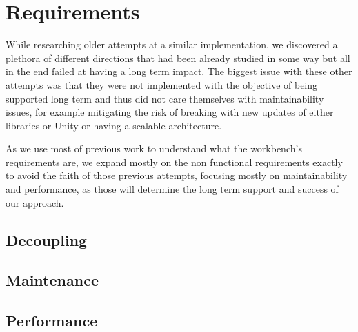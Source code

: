 \section{Requirements}\label{sec:requirements}

While researching older attempts at a similar implementation, we discovered a plethora of different directions that had been already studied in some way but all in the end failed at having a long term impact. The biggest issue with these other attempts was that they were not implemented with the objective of being supported long term and thus did not care themselves with maintainability issues, for example mitigating the risk of breaking with new updates of either libraries or Unity or having a scalable architecture.

As we use most of previous work to understand what the workbench's requirements are, we expand mostly on the non functional requirements exactly to avoid the faith of those previous attempts, focusing mostly on maintainability and performance, as those will determine the long term support and success of our approach. 

\subsection{Decoupling}\label{sec:requirements-decoupling}



\subsection{Maintenance}\label{sec:requirements-maintenance}



\subsection{Performance}\label{sec:requirements-performance}